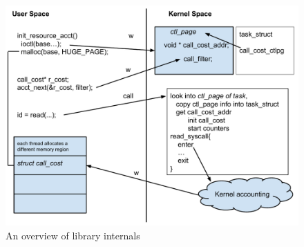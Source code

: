 \documentclass[12pt]{article}
\begin{document}
\begin{figure}[ht!]
  \includegraphics[width=\textwidth]{figures/system-design.pdf}
  \caption{An overview of library internals}
  \label{fig:sysDesign}
\end{figure}
\end{document}
